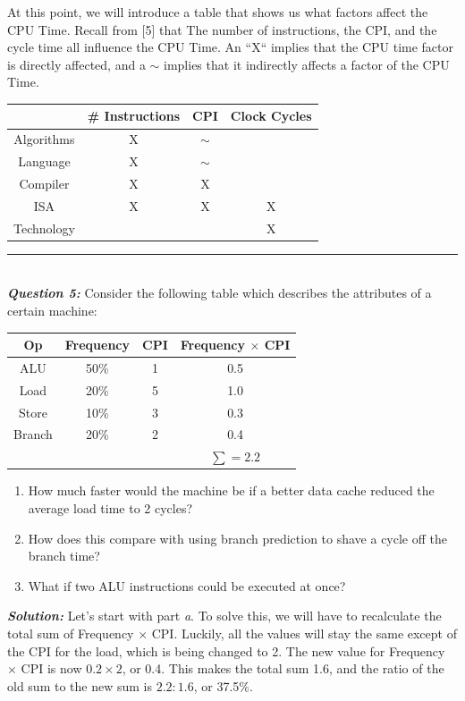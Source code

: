 \documentclass{article}
\begin{document}
\indent At this point, we will introduce a table that shows us what factors affect the CPU Time. Recall from [5] that The number of instructions, the CPI, and the cycle time all influence the CPU Time. An ``X`` implies that the CPU time factor is directly affected, and a $\sim$ implies that it indirectly affects a factor of the CPU Time.
\begin{center}
\begin{tabular}{|c|c|c|c|}
\hline
& \# Instructions & CPI & Clock Cycles \\ \hline
Algorithms & X & $\sim$ & \\ \hline
Language & X & $\sim$ & \\ \hline
Compiler & X & X & \\ \hline
ISA & X & X & X \\ \hline
Technology & & & X\\ \hline
\end{tabular}
\end{center}
\hrule
\noindent \\
\indent \textit{\textbf{Question 5:}} Consider the following table which describes the attributes of a certain machine:
\begin{center}
\begin{tabular}{|c|c|c|c|}
\hline
Op & Frequency & CPI & Frequency $\times$ CPI\\ \hline
ALU & 50\% & 1 & 0.5\\ \hline
Load & 20\% & 5 & 1.0\\ \hline
Store & 10\% & 3 & 0.3\\ \hline
Branch & 20\% & 2 & 0.4\\ \hline
& & & $\sum = 2.2$\\ \hline 
\end{tabular}
\end{center}
\begin{enumerate}
\item How much faster would the machine be if a better data cache reduced the average load time to 2 cycles?
\item How does this compare with using branch prediction to shave a cycle off the branch time?
\item What if two ALU instructions could be executed at once?
\end{enumerate}
\noindent \textit{\textbf{Solution:}} Let's start with part \textit{a}. To solve this, we will have to recalculate the total sum of Frequency $\times$ CPI. Luckily, all the values will stay the same except of the CPI for the load, which is being changed to 2. The new value for Frequency $\times$ CPI is now $0.2 \times 2$, or 0.4. This makes the total sum 1.6, and the ratio of the old sum to the new sum is $2.2 : 1.6$, or 37.5\%.\\\\
\end{document}
